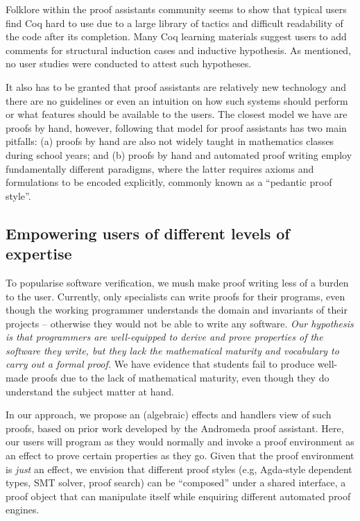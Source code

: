 \documentclass[sigconfl]{acmart}
\begin{document}
Folklore within the proof assistants community seems to show that typical users
find Coq hard to use due to a large library of tactics and difficult readability
of the code after its completion. Many Coq learning materials suggest users to
add comments for structural induction cases and inductive hypothesis. As
mentioned, no user studies were conducted to attest such hypotheses.

It also has to be granted that proof assistants are relatively new technology
and there are no guidelines or even an intuition on how such systems should
perform or what features should be available to the users. The closest model we
have are proofs by hand, however, following that model for proof assistants has
two main pitfalls: (a) proofs by hand are also not widely taught in mathematics
classes during school years; and (b) proofs by hand and automated proof
writing employ fundamentally different paradigms, where the latter requires
axioms and formulations to be encoded explicitly, commonly known as a ``pedantic
proof style''.

\subsection{Empowering users of different levels of expertise}

To popularise software verification, we mush make proof writing less of a
burden to the user. Currently, only specialists can write proofs for their
programs, even though the working programmer understands the domain and
invariants of their projects -- otherwise they would not be able to write any
software. \textit{Our hypothesis is that programmers are well-equipped to derive and
prove properties of the software they write, but they lack the mathematical maturity and
vocabulary to carry out a formal proof. } We have evidence that students fail to
produce well-made proofs due to the lack of mathematical maturity, even though
they do understand the subject matter at hand.

In our approach, we propose an (algebraic) effects and handlers view of such
proofs, based on prior work developed by the Andromeda proof assistant. Here,
our users will program as they would normally and invoke
a proof environment as an effect to prove certain properties as they go. Given
that the proof environment is \textit{just} an effect, we envision that different proof
styles (e.g, Agda-style dependent types, SMT solver, proof search) can be ``composed''
under a shared interface, a proof object that can manipulate itself while
enquiring different automated proof engines.
\end{document}

